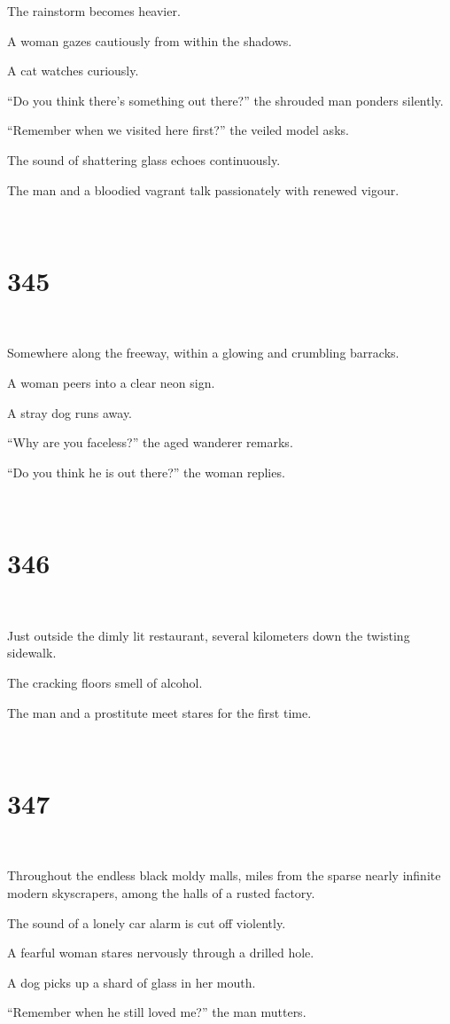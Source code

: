 \documentclass{report}
\begin{document}
The rainstorm becomes heavier.

A woman gazes cautiously from within the shadows.

A cat watches curiously.

``Do you think there's something out there?'' the shrouded man ponders silently.

``Remember when we visited here first?'' the veiled model asks.

The sound of shattering glass echoes continuously.

The man and a bloodied vagrant talk passionately with renewed vigour.

~
\chapter*{345}
~

Somewhere along the freeway, within a glowing and crumbling barracks.

A woman peers into a clear neon sign.

A stray dog runs away.

``Why are you faceless?'' the aged wanderer remarks.

``Do you think he is out there?'' the woman replies.

~
\chapter*{346}
~

Just outside the dimly lit restaurant, several kilometers down the twisting sidewalk.

The cracking floors smell of alcohol.

The man and a prostitute meet stares for the first time.

~
\chapter*{347}
~

Throughout the endless black moldy malls, miles from the sparse nearly infinite modern skyscrapers, among the halls of a rusted factory.

The sound of a lonely car alarm is cut off violently.

A fearful woman stares nervously through a drilled hole.

A dog picks up a shard of glass in her mouth.

``Remember when he still loved me?'' the man mutters.
\end{document}
